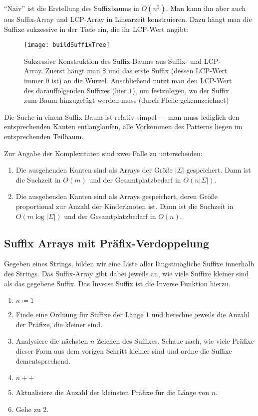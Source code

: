 ``Naiv'' ist die Erstellung des Suffixbaums in \( O(n^2) \). Man kann ihn aber auch aus Suffix-Array und LCP-Array in Linearzeit konstruieren. Dazu hängt man die Suffixe sukzessive in der Tiefe ein, die ihr LCP-Wert angibt:

\begin{figure}[H]
  \texttt{[image: buildSuffixTree]}
  \captionsetup{width=.8\textwidth}
  \caption{Sukzessive Konstruktion des Suffix-Baums aus Suffix- und LCP-Array. Zuerst hängt man \$ und das erste Suffix (dessen LCP-Wert immer \( 0 \) ist) an die Wurzel. Anschließend nutzt man den LCP-Wert des darauffolgenden Suffixes (hier \( 1 \)), um festzulegen, wo der Suffix zum Baum hinzugefügt werden muss (durch Pfeile gekennzeichnet)}
\end{figure}

Die Suche in einem Suffix-Baum ist relativ simpel --- man muss lediglich den entsprechenden Kanten entlanglaufen, alle Vorkommen des Patterns liegen im entsprechenden Teilbaum.

Zur Angabe der Komplexitäten sind zwei Fälle zu unterscheiden:

\begin{enumerate}
  \item Die ausgehenden Kanten sind als Arrays der Größe \( \left\vert \Sigma \right\vert \) gespeichert. Dann ist die Suchzeit in \textcolor{green!60!black}{\( O(m) \)} und der Gesamtplatzbedarf in \textcolor{red!80!black}{\( O(n\left\vert \Sigma \right\vert) \)}.
  \item Die ausgehenden Kanten sind als Arrays gespeichert, deren Größe proportional zur Anzahl der Kinderknoten ist. Dann ist die Suchzeit in \textcolor{red!80!black}{\( O(m\log \left\vert \Sigma \right\vert ) \)} und der Gesamtplatzbedarf in \textcolor{green!60!black}{\( O(n) \)}.
\end{enumerate}


\subsection{Suffix Arrays mit Präfix-Verdoppelung}
Gegeben eines Strings, bilden wir eine Liste aller längstmögliche Suffixe innerhalb des Strings. Das Suffix-Array gibt dabei jeweils an, wie viele Suffixe kleiner sind als das gegebene Suffix. Das Inverse Suffix ist die Inverse Funktion hierzu.

\begin{enumerate}
	\item $n\coloneqq 1$
	\item Finde eine Ordnung für Suffixe der Länge 1 und berechne jeweils die Anzahl der Präfixe, die kleiner sind. 
	\item Analysiere die nächsten $n$ Zeichen des Suffixes. Schaue nach, wie viele Präfixe dieser Form aus dem vorigen Schritt kleiner sind und ordne die Suffixe dementsprechend. 
	\item $n++$
	\item Aktualisiere die Anzahl der kleinsten Präfixe für die Länge von $n$. 
	\item Gehe zu 2.
\end{enumerate}

